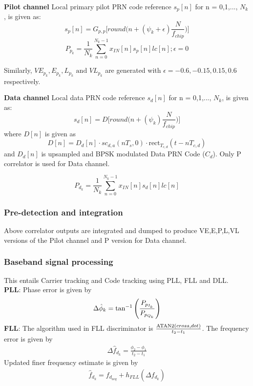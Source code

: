 \documentclass[conference]{IEEEtran}
\begin{document}
\noindent\textbf{Pilot channel}
Local primary pilot PRN code reference $s_p[n]$ for n = 0,1,..., $N_k$, is given as:
\begin{equation}
	s_p[n] = G_{p,p}\biggl[ round\biggl( n + (\psi_k + \epsilon)\frac{N}{f_{chip}}\biggr)\biggr]
\end{equation}
\begin{equation}
	P_{p_{k}} = \frac{1}{N_k} \sum_{n=0}^{N_k-1} x_{IN}[n] s_p[n] lc[n] ;  \epsilon = 0
\end{equation}

Similarly, $VE_{p_{k}}, E_{p_{k}}, L_{p_{k}} \text{ and } VL_{p_{k}}$ are generated with $\epsilon = -0.6, -0.15, 0.15, 0.6$
respectively.

\noindent\textbf{Data channel}
Local data PRN code reference $s_d[n]$ for n = 0,1,..., $N_k$, is given as:
\begin{equation}
	s_d[n] = D\biggl[ round\biggl( n + (\psi_k)\frac{N}{f_{chip}}\biggr)\biggr]
\end{equation}
\noindent where $D[n]$ is given as
\begin{equation}
	D[n] = D_d[n] \cdot sc_{d,a}(nT_s, 0) \cdot \text{rect}_{T_{c,d}} \left( t - nT_{c,d}\right)
\end{equation}
\noindent and $D_d[n]$ is upsampled and BPSK modulated Data PRN Code ($C_d$). Only P correlator is used for Data channel.

\begin{equation}
	P_{d_{k}} = \frac{1}{N_k} \sum_{n=0}^{N_k-1} x_{IN}[n] s_d[n] lc[n] 
\end{equation}

\subsubsection{Pre-detection and integration}
Above correlator outputs are integrated and dumped to produce VE,E,P,L,VL versions of the Pilot channel and P version for Data channel.
\subsubsection{Baseband signal processing}
This entails Carrier tracking and Code tracking using PLL, FLL and DLL. \\

\noindent\textbf{PLL}:
Phase error is given by  
\begin{align}
  \Delta \hat{\phi}_k = \tan^{-1}\left(\frac{P_{p_{I_{k}}}}{P_{p_{Q_{k}}}}\right)
\end{align}
\noindent\textbf{FLL}:
The algorithm used in FLL discriminator is 
$\frac{\text{ATAN2}{\ensuremath{\left(cross,dot\right)}}}{t_2-t_1}$. The frequency error is given by 
\begin{align}
	\Delta \hat{f}_{d_{k}} = \frac{\phi_2-\phi_1}{t_2-t_1}
\end{align}
\noindent Updated finer frequency estimate is given by
\begin{align}
	\hat{f}_{d_{k}} = f_{d_{acq}} + h_{FLL}(\Delta \hat{f}_{d_{k}})
\end{align}
\end{document}
